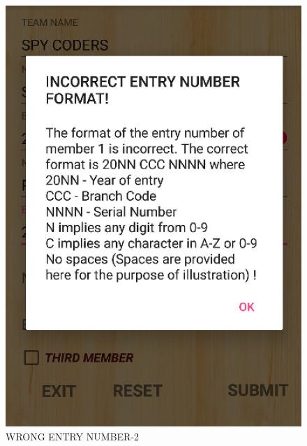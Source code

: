 \documentclass[12pt]{article}
\begin{document}
\begin{itemize}
\begin{figure}
	\centering
	\includegraphics[scale=.7]{INCORRECT_NUMBER_FORMAT}
	\caption{WRONG ENTRY NUMBER-2}
\end{figure}
\begin{figure}
	\centering

\end{figure}
\end{itemize}
\end{document}
